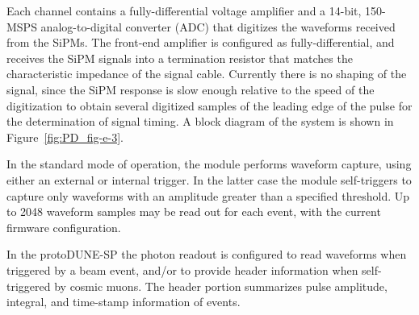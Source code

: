%
Each channel contains a fully-differential voltage amplifier and a 14-bit, 150-MSPS analog-to-digital converter (ADC) that 
digitizes the waveforms received from the SiPMs.  
The front-end amplifier is configured as fully-differential, and receives the SiPM signals into a termination resistor that 
matches the characteristic impedance of the signal cable. 
Currently there is no shaping of the signal, since the SiPM response 
is slow enough relative to the speed of the digitization to obtain 
several digitized samples of the leading edge of the pulse for the determination of signal timing.  A block diagram of the system is shown in Figure~\ref{fig:PD_fig-e-3}.


In the standard mode of operation, the module performs waveform capture, 
using either an external or internal trigger.  
In the latter case the module self-triggers to capture only waveforms with an amplitude greater than
a specified threshold.
Up to 2048 waveform samples may be read out for each event, with the current firmware 
configuration. 

In the protoDUNE-SP the photon readout is configured to read waveforms when triggered by a beam event,
and/or to provide header information when self-triggered by cosmic muons.
The header portion summarizes pulse amplitude, integral, and time-stamp information of events.

